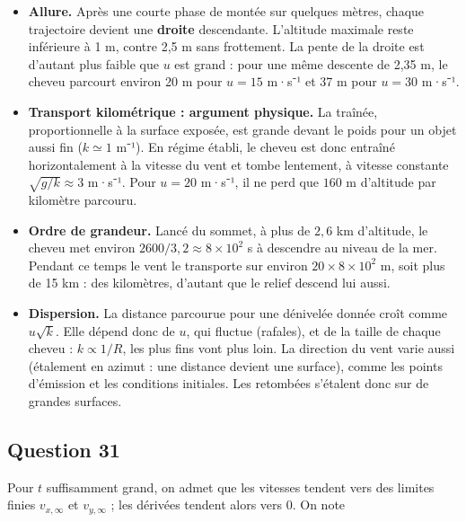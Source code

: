 \documentclass[11pt,a4paper]{article}
\providecommand{\tightlist}{\setlength{\itemsep}{0pt}\setlength{\parskip}{0pt}}
\newcommand{\equationajustee}[1]{%
  \sbox{\boiteequation}{$\displaystyle #1$}%
  \ifdim\wd\boiteequation>\linewidth
    \[\resizebox{\linewidth}{!}{\usebox{\boiteequation}}\]%
  \else
    \[#1\]%
  \fi}
\begin{document}
\begin{itemize}
\tightlist
\item
  \textbf{Allure.} Après une courte phase de montée sur quelques mètres, chaque trajectoire devient une \textbf{droite} descendante. L'altitude maximale reste inférieure à 1 m, contre 2,5 m sans frottement. La pente de la droite est d'autant plus faible que \(u\) est grand : pour une même descente de 2,35 m, le cheveu parcourt environ 20 m pour \(u = 15\) m·s⁻¹ et 37 m pour \(u = 30\) m·s⁻¹.
\item
  \textbf{Transport kilométrique : argument physique.} La traînée, proportionnelle à la surface exposée, est grande devant le poids pour un objet aussi fin (\(k \simeq 1\) m⁻¹). En régime établi, le cheveu est donc entraîné horizontalement à la vitesse du vent et tombe lentement, à vitesse constante \(\sqrt{g/k} \approx 3\) m·s⁻¹. Pour \(u = 20\) m·s⁻¹, il ne perd que \(160\) m d'altitude par kilomètre parcouru.
\item
  \textbf{Ordre de grandeur.} Lancé du sommet, à plus de \(2{,}6\) km d'altitude, le cheveu met environ \(2600/3{,}2 \approx 8\times10^2\) s à descendre au niveau de la mer. Pendant ce temps le vent le transporte sur environ \(20\times 8\times10^2\) m, soit plus de 15 km : des kilomètres, d'autant que le relief descend lui aussi.
\item
  \textbf{Dispersion.} La distance parcourue pour une dénivelée donnée croît comme \(u\sqrt{k}\). Elle dépend donc de \(u\), qui fluctue (rafales), et de la taille de chaque cheveu : \(k \propto 1/R\), les plus fins vont plus loin. La direction du vent varie aussi (étalement en azimut : une distance devient une surface), comme les points d'émission et les conditions initiales. Les retombées s'étalent donc sur de grandes surfaces.
\end{itemize}

\hypertarget{question-31}{%
\subsection{Question 31}\label{question-31}}

Pour \(t\) suffisamment grand, on admet que les vitesses tendent vers des limites finies \(v_{x,\infty}\) et \(v_{y,\infty}\) ; les dérivées tendent alors vers \(0\). On note

\equationajustee{\begin{aligned}
N &= \|\vec v_\infty - \vec u\| \\
&= \sqrt{(v_{x,\infty} - u)^2 + v_{y,\infty}^2}
\end{aligned}}
\end{document}
